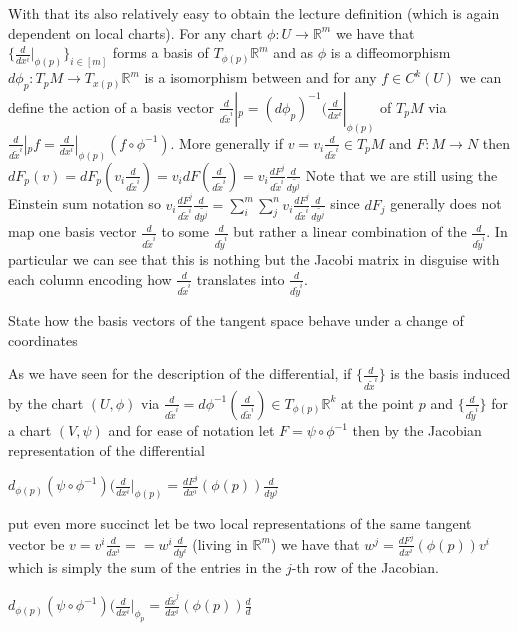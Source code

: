 With that its also relatively easy to obtain the lecture definition (which is again dependent on local charts).
For any chart \( \phi : U \to \mathbb{R}^m \) we have that \( \{\frac{d}{dx^i}|_{\phi(p)}\}_{i \in [m]} \) forms a basis of \( T_{\phi(p)} \mathbb{R}^m \)
and as \( \phi \) is a diffeomorphism \( d\phi_p : T_p M \to T_{x(p)} \mathbb{R}^m \) is a isomorphism between and for any \( f \in C^k(U) \)
we can define the action of a basis vector \( \frac{d}{d\tilde{x}^i}|_p = (d\phi_p)^{-1}(\frac{d}{dx^i}|_{\phi(p)}\) of \( T_p M \) via
\( \frac{d}{d\tilde{x}^i}|_p f = \frac{d}{dx^i}|_{\phi(p)}(f \circ \phi^{-1}) \).
More generally if \( v = v_i \frac{d}{d\tilde{x}^i} \in T_p M \) and \( F : M \to N \) then
\( dF_p(v) = dF_p(v_i \frac{d}{d\tilde{x}^i}) = v_i dF(\frac{d}{d\tilde{x}^i}) = v_i \frac{dF^j}{d\tilde{x}^i}\frac{d}{d\tilde{y^j}} \)
Note that we are still using the Einstein sum notation so 
\( v_i \frac{dF^j}{d\tilde{x}^i}\frac{d}{d\tilde{y^j}} = \sum_i^m \sum_j^n v_i \frac{dF^j}{d\tilde{x}^i}\frac{d}{d\tilde{y^j}} \)
since \(dF_j \) generally does not map one basis vector \( \frac{d}{d\tilde{x}^i} \) to some \( \frac{d}{d\tilde{y}^i} \) but rather
a linear combination of the \( \frac{d}{d\tilde{y}^i} \). In particular we can see that this is nothing but the Jacobi matrix in disguise
with each column encoding how \( \frac{d}{d\tilde{x}^i} \) translates into \( \frac{d}{d\tilde{y}^i} \).

State how the basis vectors of the tangent space behave under a change of coordinates

As we have seen for the description of the differential, if \( \{\frac{d}{d\tilde{x}^i}\} \) is the basis
induced by the chart \( (U, \phi) \) via \( \frac{d}{d\tilde{x}^i} = d\phi^{-1}(\frac{d}{d\tilde{x}^i}) \in T_{\phi(p)} \mathbb{R}^k \) 
at the point \( p \) and \( \{\frac{d}{d\tilde{y}^i}\} \) for a chart \( (V, \psi) \) and for ease of notation let \( F = \psi \circ \phi^{-1} \)
then by the Jacobian representation of the differential

\(d_{\phi(p)}(\psi \circ \phi^{-1})(\frac{d}{dx^i}|_{\phi(p)} = \frac{dF^j}{dx^i}(\phi(p))\frac{d}{dy^j} \)

put even more succinct let be two local representations of the same tangent vector be \( v = v^i\frac{d}{dx^i} = = w^i\frac{d}{dy^i} \) 
(living in \(\mathbb{R}^m\)) 
we have that 
\( w^j = \frac{dF^j}{dx^i}(\phi(p))v^i \)
which is simply the sum of the entries in the \(j\)-th row of the Jacobian.

\( d_{\phi(p)}(\psi \circ \phi^{-1})(\frac{d}{dx^i}|_{\phi_p} = \frac{d\tilde{x}^j}{dx^i}(\phi(p))\frac{d}{d} \)


